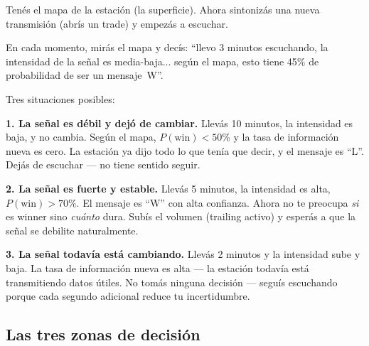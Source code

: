 \documentclass[11pt,a4paper]{article}
\newcommand{\pw}{P(\text{win})}
\begin{document}
\begin{tcolorbox}[radio, title=La radio: decodificar el mensaje]
Ten\'es el mapa de la estaci\'on (la superficie). Ahora sintoniz\'as
una nueva transmisi\'on (abr\'is un trade) y empez\'as a escuchar.

En cada momento, mir\'as el mapa y dec\'is: ``llevo 3 minutos
escuchando, la intensidad de la se\~nal es media-baja... seg\'un
el mapa, esto tiene 45\% de probabilidad de ser un mensaje~W''.

Tres situaciones posibles:

\textbf{1. La se\~nal es d\'ebil y dej\'o de cambiar.} Llevás 10
minutos, la intensidad es baja, y no cambia. Seg\'un el mapa,
$\pw < 50\%$ y la tasa de informaci\'on nueva es cero. La estaci\'on
ya dijo todo lo que ten\'ia que decir, y el mensaje es ``L''. Dej\'as
de escuchar --- no tiene sentido seguir.

\textbf{2. La se\~nal es fuerte y estable.} Llevás 5 minutos, la
intensidad es alta, $\pw > 70\%$. El mensaje es ``W'' con alta
confianza. Ahora no te preocupa \emph{si} es winner sino
\emph{cu\'anto} dura. Sub\'is el volumen (trailing activo) y
esper\'as a que la se\~nal se debilite naturalmente.

\textbf{3. La se\~nal todav\'ia est\'a cambiando.} Llevás 2 minutos
y la intensidad sube y baja. La tasa de informaci\'on nueva es alta
--- la estaci\'on todav\'ia est\'a transmitiendo datos \'utiles. No
tom\'as ninguna decisi\'on --- segu\'is escuchando porque cada segundo
adicional reduce tu incertidumbre.
\end{tcolorbox}

\subsection{Las tres zonas de decisi\'on}
\end{document}
